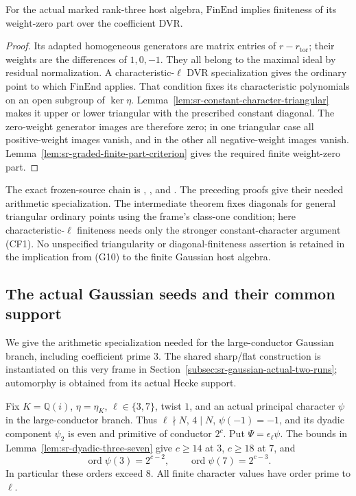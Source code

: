 \begin{srproposition}\label{prop:sr-host-finite-part-from-finend}
For the actual marked rank-three host algebra,
\(\mathrm{FinEnd}\) implies finiteness of its weight-zero
part over the coefficient DVR.
\end{srproposition}
\begin{proof}
Its adapted homogeneous generators are matrix entries
of \(r-r_{\mathrm{tor}}\); their weights are the
differences of \(1,0,-1\).
They all belong to the maximal ideal by residual
normalization.
A characteristic-\(\ell\) DVR specialization gives the
ordinary point to which \(\mathrm{FinEnd}\) applies.
That condition fixes its characteristic polynomials
on an open subgroup of \(\ker\eta\).
Lemma~\ref{lem:sr-constant-character-triangular} makes
it upper or lower triangular with the prescribed
constant diagonal.
The zero-weight generator images are therefore zero;
in one triangular case all positive-weight images
vanish, and in the other all negative-weight images
vanish.
Lemma~\ref{lem:sr-graded-finite-part-criterion}
gives the required finite weight-zero part.
\end{proof}

The exact frozen-source chain is
,
,
and
.
The preceding proofs give their needed arithmetic specialization.
The intermediate  theorem fixes diagonals for
general triangular ordinary points using the frame's class-one
condition; here characteristic-\(\ell\) finiteness needs only
the stronger constant-character argument (CF1).
No unspecified triangularity or diagonal-finiteness assertion
is retained in the implication from (G10) to the finite
Gaussian host algebra.


\subsection{The actual Gaussian seeds and their common support}
\label{subsec:sr-gaussian-producer}
We give the arithmetic specialization needed for the
large-conductor Gaussian branch, including coefficient
prime \(3\).
The shared sharp/flat construction is instantiated on this
very frame in Section~\ref{subsec:sr-gaussian-actual-two-runs};
automorphy is obtained from its actual Hecke support.

Fix \(K=\mathbb Q(i)\), \(\eta=\eta_K\),
\(\ell\in\{3,7\}\), twist \(1\), and an actual principal
character \(\psi\) in the large-conductor branch.
Thus \(\ell\nmid N\), \(4\mid N\),
\(\psi(-1)=-1\), and its dyadic component \(\psi_2\)
is even and primitive of conductor \(2^c\).
Put \(\Psi=\epsilon_\ell\psi\).
The bounds in Lemma~\ref{lem:sr-dyadic-three-seven}
give \(c\ge14\) at \(3\), \(c\ge18\) at \(7\), and
\[
           \operatorname{ord}\psi(3)=2^{c-2},\qquad
           \operatorname{ord}\psi(7)=2^{c-3}.
 \tag{G1}
\]
In particular these orders exceed \(8\).
All finite character values have order prime to \(\ell\).

